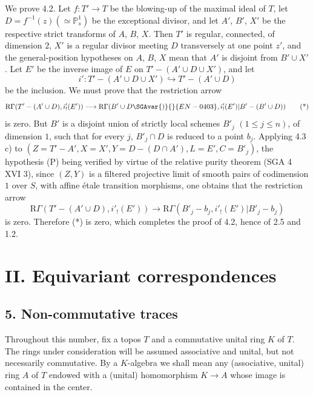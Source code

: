 We prove 4.2. Let $f:T'\to T$ be the blowing-up of the maximal ideal of $T$, let $D=f^{-1}(z)(\simeq\mathbb P^1_s)$ be the exceptional divisor, and let $A'$, $B'$, $X'$ be the respective strict transforms of $A$, $B$, $X$. Then $T'$ is regular, connected, of dimension $2$, $X'$ is a regular divisor meeting $D$ transversely at one point $z'$, and the general-position hypotheses on $A$, $B$, $X$ mean that $A'$ is disjoint from %
$B'\cup X'$. Let $E'$ be the inverse image of $E$ on $T'-(A'\cup D\cup X')$, and let
\[
i':T'-(A'\cup D\cup X')\hookrightarrow T'-(A'\cup D)
\]
be the inclusion. We must prove that the restriction arrow
\begin{equation}
\mathrm R\Gamma(T'-(A'\cup D),i'_!(E'))
\longrightarrow
\mathrm R\Gamma(B'\cup D\SGAvar{)}{}{EN-0403},i'_!(E')|B'-(B'\cup D))
\tag{*}
\end{equation}
is zero. But $B'$ is a disjoint union of strictly local schemes $B'_j$ $(1\le j\le n)$, of dimension $1$, such that for every $j$, $B'_j\cap D$ is reduced to a point $b_j$. Applying 4.3 c) to $(Z=T'-A', X=X', Y=D-(D\cap A'), L=E', C=B'_j)$, the hypothesis (P) being verified by virtue of the relative purity theorem (SGA 4 XVI 3), since $(Z,Y)$ is a filtered projective limit of smooth pairs of codimension $1$ over $S$, with affine étale transition morphisms, one obtains that the restriction arrow
\[
\mathrm R\Gamma(T'-(A'\cup D),i'_!(E'))
\longrightarrow
\mathrm R\Gamma(B'_j-b_j,i'_!(E')|B'_j-b_j)
\]
is zero. Therefore (*) is zero, which completes the proof of 4.2, hence of 2.5 and 1.2.

\section*{II. Equivariant correspondences}

\subsection*{5. Non-commutative traces}

Throughout this number, fix a topos $T$ and a commutative unital ring $K$ of $T$. The rings under consideration will be assumed associative and unital, but not necessarily commutative. By a $K$-algebra we shall mean any (associative, unital) ring $A$ of $T$ endowed with a (unital) homomorphism $K\to A$ whose image is contained in the center.

